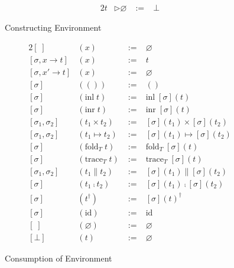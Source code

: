 \documentclass{jsarticle}
\begin{document}
\begin{figure}[H]
\begin{minipage}[b]{0.48\hsize}
\begin{alignat*}{2}
      t                 &\triangleright \varnothing       \;&:=\; &\bot
    \end{alignat*}
    \caption{Constructing Environment}
    \label{fig:tm_mcth}
  \end{minipage}
  \begin{minipage}[b]{0.48\hsize}
    \begin{alignat*}{2}
      [\;]&(x)                                  \;&:=\; &\varnothing \\
      [\sigma,x\rightarrow t]&(x)               \;&:=\; &t \\
      [\sigma,x'\rightarrow t]&(x)              \;&:=\; &\varnothing \\
      [\sigma]&(())                             \;&:=\; &() \\
      [\sigma]&(\text{inl}\;t)                  \;&:=\; &\text{inl}\;[\sigma](t) \\
      [\sigma]&(\text{inr}\;t)                  \;&:=\; &\text{inr}\;[\sigma](t) \\
      [\sigma_1,\sigma_2]&(t_1\times{}t_2)      \;&:=\; &[\sigma](t_1)\times[\sigma](t_2) \\
      [\sigma_1,\sigma_2]&(t_1\mapsto{}t_2)     \;&:=\; &[\sigma](t_1)\mapsto[\sigma](t_2) \\
      [\sigma]&(\text{fold}_T\;t)    \;&:=\; &\text{fold}_T\;[\sigma](t) \\
      [\sigma]&(\text{trace}_T\;t)   \;&:=\; &\text{trace}_T\;[\sigma](t) \\
      [\sigma_1,\sigma_2]&(t_1\parallel{}t_2)   \;&:=\; &[\sigma](t_1)\parallel[\sigma](t_2) \\
      [\sigma]&(t_1\fcmp{}t_2)       \;&:=\; &[\sigma](t_1)\fcmp[\sigma](t_2) \\
      [\sigma]&(t^\dagger)           \;&:=\; &[\sigma](t)^\dagger \\
      [\sigma]&(\text{id})           \;&:=\; &\text{id} \\
      [\;]&(\varnothing)             \;&:=\; &\varnothing \\
      [\bot]&(t)                     \;&:=\; &\varnothing
    \end{alignat*}
    \caption{Consumption of Environment}
    \label{fig:tm_sbst}
  \end{minipage}
\end{figure}
\end{document}
